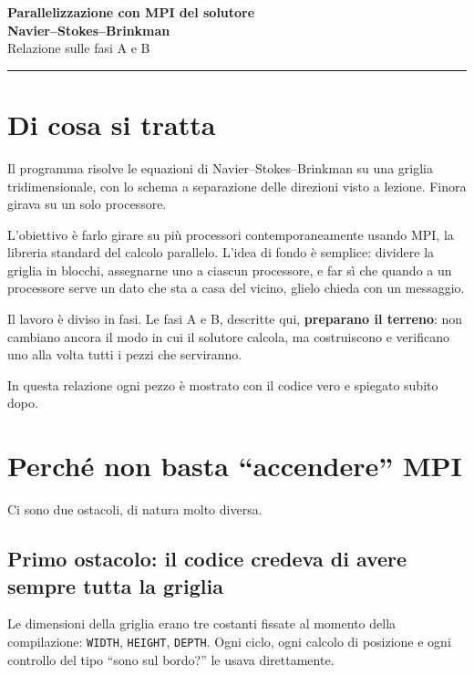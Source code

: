 \documentclass[11pt,a4paper]{article}
\newcommand{\cd}[1]{\texttt{\small #1}}
\begin{document}
\begin{center}
{\LARGE\bfseries\color{scuro} Parallelizzazione con MPI del solutore\\[2pt]
Navier--Stokes--Brinkman}\\[8pt]
{\large Relazione sulle fasi A e B}\\[10pt]
\end{center}

\hrule
\vspace{1.2em}

\section{Di cosa si tratta}

Il programma risolve le equazioni di Navier--Stokes--Brinkman su una griglia
tridimensionale, con lo schema a separazione delle direzioni visto a lezione.
Finora girava su un solo processore.

L'obiettivo è farlo girare su più processori contemporaneamente usando MPI, la
libreria standard del calcolo parallelo. L'idea di fondo è semplice: dividere
la griglia in blocchi, assegnarne uno a ciascun processore, e far sì che quando
a un processore serve un dato che sta a casa del vicino, glielo chieda con un
messaggio.

Il lavoro è diviso in fasi. Le fasi A e B, descritte qui, \textbf{preparano il
terreno}: non cambiano ancora il modo in cui il solutore calcola, ma
costruiscono e verificano uno alla volta tutti i pezzi che serviranno.

In questa relazione ogni pezzo è mostrato con il codice vero e spiegato subito
dopo.

\section{Perché non basta ``accendere'' MPI}

Ci sono due ostacoli, di natura molto diversa.

\subsection*{Primo ostacolo: il codice credeva di avere sempre tutta la griglia}

Le dimensioni della griglia erano tre costanti fissate al momento della
compilazione: \cd{WIDTH}, \cd{HEIGHT}, \cd{DEPTH}. Ogni ciclo, ogni calcolo di
posizione e ogni controllo del tipo ``sono sul bordo?'' le usava direttamente.
\end{document}
